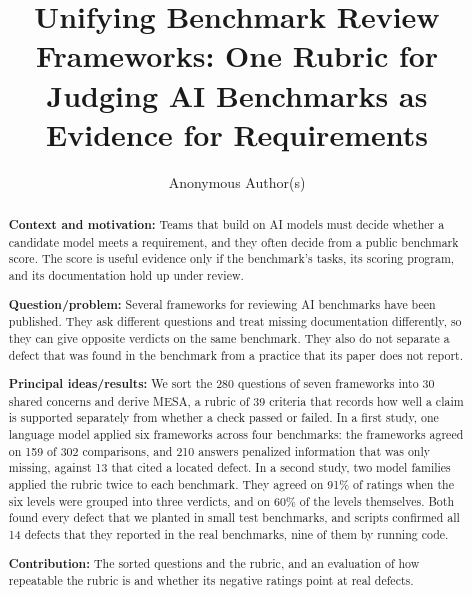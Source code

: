 \documentclass[runningheads]{llncs}
\begin{document}
\title{Unifying Benchmark Review Frameworks: One Rubric for Judging AI Benchmarks as Evidence for Requirements}

\author{Anonymous Author(s)}


\maketitle

\begin{abstract}
\textbf{Context and motivation:} Teams that build on AI models must decide whether a candidate model meets a requirement, and they often decide from a public benchmark score. The score is useful evidence only if the benchmark's tasks, its scoring program, and its documentation hold up under review.

\textbf{Question/problem:} Several frameworks for reviewing AI benchmarks have been published. They ask different questions and treat missing documentation differently, so they can give opposite verdicts on the same benchmark. They also do not separate a defect that was found in the benchmark from a practice that its paper does not report.

\textbf{Principal ideas/results:} We sort the 280 questions of seven frameworks into 30 shared concerns and derive MESA, a rubric of 39 criteria that records how well a claim is supported separately from whether a check passed or failed. In a first study, one language model applied six frameworks across four benchmarks: the frameworks agreed on 159 of 302 comparisons, and 210 answers penalized information that was only missing, against 13 that cited a located defect. In a second study, two model families applied the rubric twice to each benchmark. They agreed on 91\% of ratings when the six levels were grouped into three verdicts, and on 60\% of the levels themselves. Both found every defect that we planted in small test benchmarks, and scripts confirmed all 14 defects that they reported in the real benchmarks, nine of them by running code.

\textbf{Contribution:} The sorted questions and the rubric, and an evaluation of how repeatable the rubric is and whether its negative ratings point at real defects.

\end{abstract}
\end{document}
